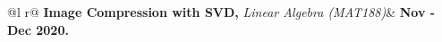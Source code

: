 \begin{tabularx}{\linewidth}{ @{}l r@{} }
\textbf{Image Compression with SVD,} \textit{Linear Algebra (MAT188)}& \hfill \textbf{Nov - Dec 2020. \href{https://www.github.com/destefy/portfolio}{\faLink}} \\[3.75pt]
 \\
\end{tabularx}
\\[10pt]